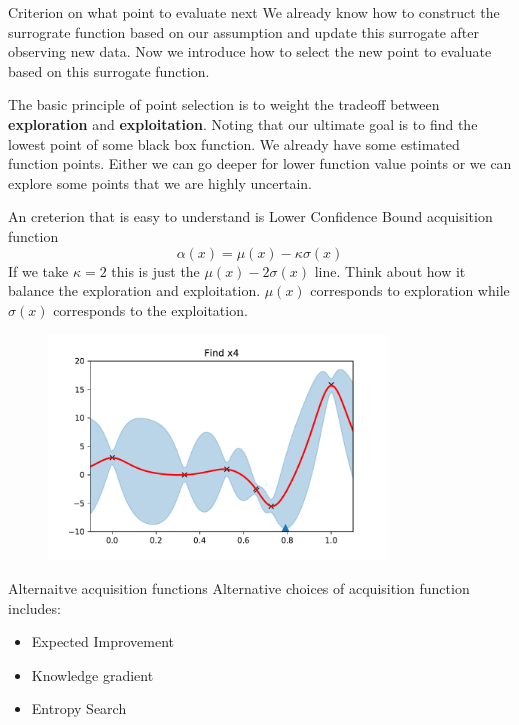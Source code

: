\documentclass{beamer}
\begin{document}
\begin{frame}[allowframebreaks]{Criterion on what point to evaluate next}
We already know how to construct the surrograte function based on our assumption and update this surrogate after observing new data. Now we introduce how to select the new point to evaluate based on this surrogate function.

The basic principle of point selection is to weight the tradeoff between \textbf{exploration} and \textbf{exploitation}. Noting that our ultimate goal is to find the lowest point of some black box function. We already have some estimated function points. Either we can go deeper for lower function value points or we can explore some points that we are highly uncertain. 


\framebreak 

An creterion that is easy to understand is Lower Confidence Bound acquisition function
$$\alpha(x) = \mu(x) - \kappa \sigma(x)$$
If we take $\kappa=2$ this is just the $\mu(x) - 2\sigma(x)$ line. Think about how it balance the exploration and exploitation. $\mu(x)$ corresponds to exploration while $\sigma(x)$ corresponds to the exploitation.



\begin{figure}
\centering
\includegraphics[width=0.8\textwidth]{./img/4}
\end{figure}
\end{frame}

\begin{frame}{Alternaitve acquisition functions}
Alternative choices of acquisition function includes:
\begin{itemize}
\item Expected Improvement
\item Knowledge gradient 
\item Entropy Search
\end{itemize}
\end{frame}
\end{document}
